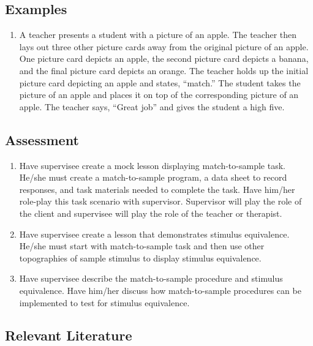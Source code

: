 \subsection{Examples}
\begin{enumerate}
\item A teacher presents a student with a picture of an apple. The teacher then lays out three other picture cards away from the original picture of an apple. One picture card depicts an apple, the second picture card depicts a banana, and the final picture card depicts an orange. The teacher holds up the initial picture card depicting an apple and states, ``match.''  The student takes the picture of an apple and places it on top of the corresponding picture of an apple. The teacher says, ``Great job'' and gives the student a high five.
\end{enumerate}
%
\subsection{Assessment}
\begin{enumerate}
\item Have supervisee create a mock lesson displaying match-to-sample task. He/she must create a match-to-sample program, a data sheet to record responses, and task materials needed to complete the task. Have him/her role-play this task scenario with supervisor. Supervisor will play the role of the client and supervisee will play the role of the teacher or therapist.
\item Have supervisee create a lesson that demonstrates stimulus equivalence. He/she must start with match-to-sample task and then use other topographies of sample stimulus to display stimulus equivalence. 
\item Have supervisee describe the match-to-sample procedure and stimulus equivalence. Have him/her discuss how match-to-sample procedures can be implemented to test for stimulus equivalence. 
\end{enumerate}
%
\subsection{Relevant Literature}
\begin{refsection}
\nocite{test,alang2017police,clayton2018black}
\printbibliography[heading=none]
\end{refsection}
%

